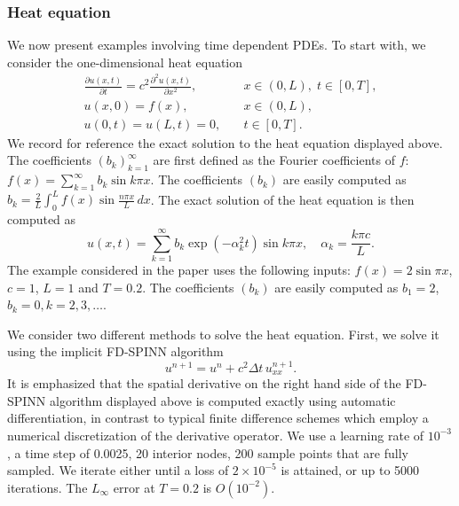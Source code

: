 \documentclass[12pt]{article}
\newcommand{\rr}[1]{#1}
\newcommand{\rb}[1]{#1}
\begin{document}
\subsubsection{Heat equation}
We now present examples involving time dependent PDEs. To start with, we consider the one-dimensional heat equation
\begin{displaymath}
\begin{split}
\frac{\partial u(x,t)}{\partial t} = c^2\frac{\partial^2 u(x,t)}{\partial x^2},& \quad x \in (0,L), \; t \in [0, T],\\
u(x, 0) = f(x),& \quad x \in (0,L),\\
u(0,t) = u(L,t) = 0,& \quad t \in [0,T].
\end{split}
\end{displaymath}
We record for reference the exact solution to the heat equation displayed above. The coefficients $(b_k)_{k=1}^{\infty}$ are first defined as the Fourier coefficients of $f$: $f(x) = \sum_{k=1}^{\infty} b_k \sin k\pi x$. The coefficients $(b_k)$ are easily computed as $b_k = \frac{2}{L}\int_{0}^{L} f(x) \sin \frac{n\pi x}{L}\, dx$. The exact solution of the heat equation is then computed as
\begin{displaymath}
u(x,t) = \sum_{k=1}^{\infty} b_k \exp (-\alpha_k^2 t) \sin k\pi x, \quad \alpha_k = \frac{k\pi c}{L}.
\end{displaymath}
The example considered in the paper uses the following inputs: $f(x) = 2\sin \pi x$, $c = 1$, $L = 1$ and \rb{$T = 0.2$}. The coefficients $(b_k)$ are easily computed as $b_1 = 2$, $b_k = 0, k = 2, 3, \ldots$.

We consider two different methods to solve the heat equation. First, we solve it using the implicit FD-SPINN algorithm
\begin{displaymath}
u^{n+1} = u^n + c^2 \Delta t \, u^{n+1}_{xx}.
\end{displaymath}
It is emphasized that the spatial derivative on the right hand side of the FD-SPINN algorithm displayed above is computed exactly using automatic differentiation, in contrast to typical finite difference schemes which employ a numerical discretization of the derivative operator.  \rb{We use a learning rate of $10^{-3}$, a time step of 0.0025, 20 interior nodes, 200 sample points that are fully sampled. We iterate either until a loss of $2\times 10^{-5}$ is attained, or up to 5000 iterations.} \rr{The $L_{\infty}$ error at $T=0.2$ is $O(10^{-2})$.}
\end{document}
